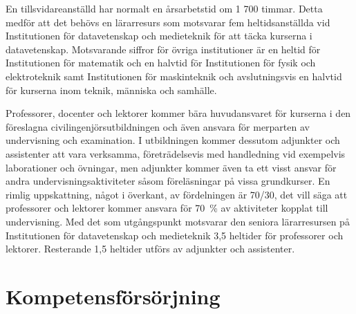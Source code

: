 \begin{table}[tbh]
\caption{Fördelning av lärartimmar mellan de olika ingående institutionerna.\label{tab:larh}}
\centering
{}
\end{table}

En tillsvidareanställd har normalt en årsarbetstid om 1 700 timmar. Detta medför att det behövs en lärarresurs som motsvarar fem heltidsanställda vid Institutionen för datavetenskap och medieteknik för att täcka kurserna i datavetenskap. Motsvarande siffror för övriga institutioner är en heltid för Institutionen för matematik och en halvtid för Institutionen för fysik och elektroteknik samt Institutionen för maskinteknik och avslutningsvis en halvtid för kurserna inom teknik, människa och samhälle.

Professorer, docenter och lektorer kommer bära huvudansvaret för kurserna i den föreslagna civilingenjörsutbildningen och även ansvara för merparten av undervisning och examination. I utbildningen kommer dessutom adjunkter och assistenter att vara verksamma, företrädelsevis med handledning vid exempelvis laborationer och övningar, men adjunkter kommer även ta ett visst ansvar för andra undervisningsaktiviteter såsom föreläsningar på vissa grundkurser. En rimlig uppskattning, något i överkant, av fördelningen är 70/30, det vill säga att professorer och lektorer kommer ansvara för 70~\% av aktiviteter kopplat till undervisning. Med det som utgångspunkt motsvarar den seniora lärarresursen på Institutionen för datavetenskap och medieteknik 3,5 heltider för professorer och lektorer. Resterande 1,5 heltider utförs av adjunkter och assistenter.

\section{Kompetensförsörjning}

